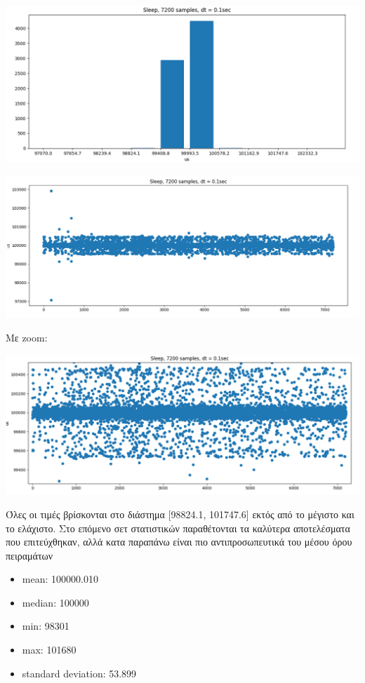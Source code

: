 \documentclass[12pt,a4paper]{article}
\begin{document}
\includegraphics[scale=0.5]{cal_sleep_1_hist.png}

\includegraphics[scale=0.5]{cal_sleep_1_sctr.png}

Mε zoom:

\includegraphics[scale=0.5]{cal_sleep_1_sctr_zoom.png}


Όλες οι τιμές βρίσκονται στο διάστημα [98824.1, 101747.6] εκτός από το μέγιστο και το ελάχιστο. Στο επόμενο σετ στατιστικών παραθέτονται τα καλύτερα αποτελέσματα που επιτεύχθηκαν, αλλά κατα παραπάνω είναι πιο αντιπροσωπευτικά του μέσου όρου πειραμάτων


\begin{itemize}
\item mean: 100000.010
\item median: 100000
\item min: 98301
\item max: 101680
\item standard deviation:  53.899
\end{itemize}
\end{document}
